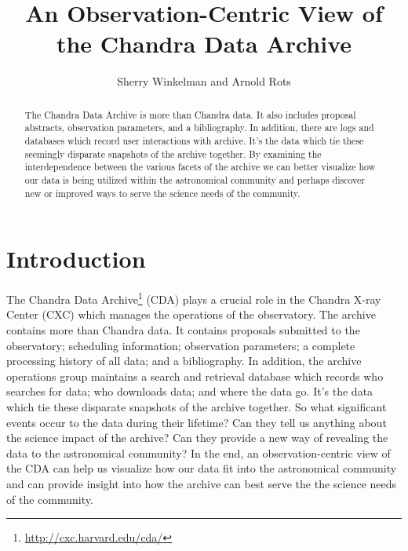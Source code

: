 
\resetcounters


\title{An Observation-Centric View of the Chandra Data Archive}
\author{Sherry Winkelman and Arnold Rots}


\begin{abstract}
The Chandra Data Archive is more than Chandra data. It also includes proposal abstracts, observation parameters, and a bibliography.  In addition, there are logs and databases which record user interactions with archive.  It's the data which tie these seemingly disparate snapshots of the archive together.  By examining the interdependence between the various facets of the archive we can better visualize how our data is being utilized within the astronomical community and perhaps discover new or improved ways to serve the science needs of the community.

\end{abstract}

\section{Introduction}
The Chandra Data Archive\footnote{\url{http://cxc.harvard.edu/cda/}} (CDA) plays a crucial role in the Chandra X-ray Center (CXC) which manages the operations of the observatory.  The archive contains more than Chandra data.  It contains proposals submitted to the observatory; scheduling information; observation parameters; a complete processing history of all data; and a bibliography.  In addition, the archive operations group maintains a search and retrieval database which records who searches for data; who downloads data; and where the data go.  It's the data which tie these disparate snapshots of the archive together.  So what significant events occur to the data during their lifetime? Can they tell us anything about the science impact of the archive? Can they provide a new way of revealing the data to the astronomical community?  In the end, an observation-centric view of the CDA can help us visualize how our data fit into the astronomical community and can provide insight into how the archive can best serve the the science needs of the community.

